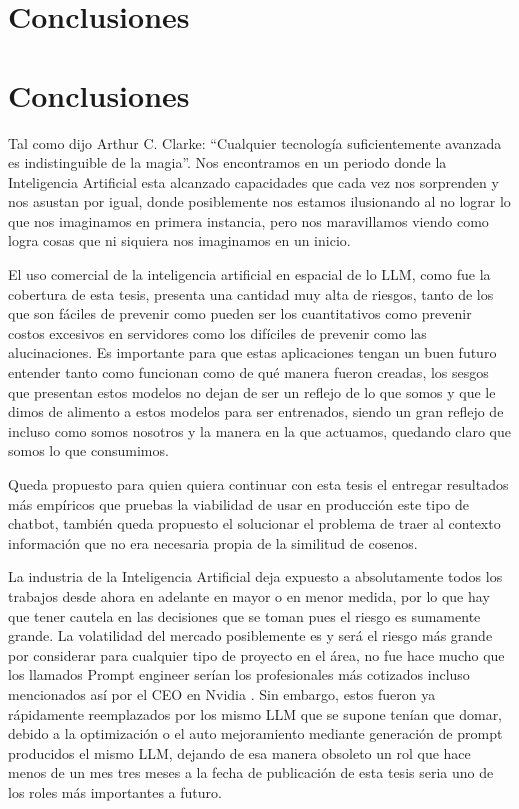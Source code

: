 
\chapter{Conclusiones}

\chapter{Conclusiones}

\par Tal como dijo Arthur C. Clarke: ``Cualquier tecnología suficientemente avanzada es indistinguible de la magia''. Nos encontramos 
en un periodo donde la Inteligencia Artificial esta alcanzado capacidades que cada vez nos sorprenden y nos asustan por igual, donde 
posiblemente nos estamos ilusionando al no lograr lo que nos imaginamos en primera instancia, pero nos maravillamos viendo como logra 
cosas que ni siquiera nos imaginamos en un inicio.  

\par El uso comercial de la inteligencia artificial en espacial de lo LLM, como fue la cobertura de esta tesis, presenta una cantidad 
muy alta de riesgos, tanto de los que son fáciles de prevenir como pueden ser los cuantitativos como prevenir costos excesivos en 
servidores como los difíciles de prevenir como las alucinaciones.  Es importante para que estas aplicaciones tengan un buen futuro 
entender tanto como funcionan como de qué manera fueron creadas, los sesgos que presentan estos modelos no dejan de ser un reflejo
de lo que somos y que le dimos de alimento a estos modelos para ser entrenados, siendo un gran reflejo de incluso como somos nosotros 
y la manera en la que actuamos, quedando claro que somos lo que consumimos. 

\par Queda propuesto para quien quiera continuar con esta tesis el entregar resultados más empíricos que pruebas la viabilidad de 
usar en producción este tipo de chatbot, también queda propuesto el solucionar el problema de traer al contexto información que no 
era necesaria propia de la similitud de cosenos. 

\par La industria de la Inteligencia Artificial deja expuesto a absolutamente todos los trabajos desde ahora en adelante en mayor 
o en menor medida, por lo que hay que tener cautela en las decisiones que se toman pues el riesgo es sumamente grande. La 
volatilidad del mercado posiblemente es y será el riesgo más grande por considerar para cualquier tipo de proyecto en el área, 
no fue hace mucho que los llamados Prompt engineer serían los profesionales más cotizados incluso mencionados así por el CEO en 
Nvidia \cite{conclusion1}. Sin embargo, estos fueron ya rápidamente reemplazados por los mismo LLM que se supone tenían que domar, debido a la optimización \cite{conclusion2}
o el auto mejoramiento mediante generación de prompt producidos el mismo LLM, dejando de esa manera obsoleto un rol que hace menos de 
un mes tres meses a la fecha de publicación de esta tesis seria uno de los roles más importantes a futuro.